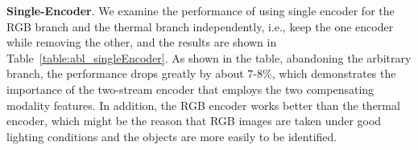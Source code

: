 \documentclass[10.5pt,twocolumn,journal,letterpaper]{IEEEtran}
\newcommand{\ie}{i.e.}
\begin{document}
\begin{table*}[!t]
	\centering
	\caption{Ablation of single encoder. NTE: RSFNet with No Thermal Encoder; NRE: RSFNet with No RGB Encoder.}
	\label{table:abl_singleEncoder}
\end{table*}

\textbf{Single-Encoder}. We examine the performance of using single encoder for the RGB branch and the thermal branch independently, \ie, keep the one encoder while removing the other, and the results are shown in Table~\ref{table:abl_singleEncoder}. As shown in the table, abandoning the arbitrary branch, the performance drops greatly by about 7-8\%, which demonstrates the importance of the two-stream encoder that employs the two compensating modality features. In addition, the RGB encoder works better than the thermal encoder, which might be the reason that RGB images are taken under good lighting conditions and the objects are more easily to be identified.  
\end{document}
